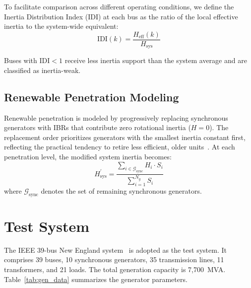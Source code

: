 \documentclass[]{ieeeaccess}
\begin{document}
To facilitate comparison across different operating conditions, we define the Inertia Distribution Index (IDI) at each bus as the ratio of the local effective inertia to the system-wide equivalent:
\begin{equation}
    \mathrm{IDI}(k) = \frac{H_{\mathrm{eff}}(k)}{H_{\mathrm{sys}}}
    \label{eq:idi}
\end{equation}

Buses with $\mathrm{IDI} < 1$ receive less inertia support than the system average and are classified as inertia-weak.

\subsection{Renewable Penetration Modeling}

Renewable penetration is modeled by progressively replacing synchronous generators with IBRs that contribute zero rotational inertia ($H = 0$). The replacement order prioritizes generators with the smallest inertia constant first, reflecting the practical tendency to retire less efficient, older units~\cite{ulbig2014}. At each penetration level, the modified system inertia becomes:
\begin{equation}
    H_{\mathrm{sys}}^{\prime} = \frac{\displaystyle\sum_{i \in \mathcal{G}_{\mathrm{sync}}} H_i \cdot S_i}{\displaystyle\sum_{i=1}^{N_g} S_i}
    \label{eq:hsys_mod}
\end{equation}
where $\mathcal{G}_{\mathrm{sync}}$ denotes the set of remaining synchronous generators.

\section{Test System}
\label{sec:system}

The IEEE 39-bus New England system~\cite{kundur1994} is adopted as the test system. It comprises 39 buses, 10 synchronous generators, 35 transmission lines, 11 transformers, and 21 loads. The total generation capacity is 7{,}700~MVA. Table~\ref{tab:gen_data} summarizes the generator parameters.
\end{document}
